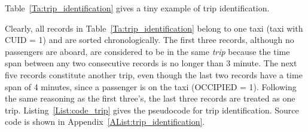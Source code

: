 Table~\ref{Ta:trip_identification} gives a tiny example of trip identification.

\begin{table}[h]
\centering
{}
\caption{An example of trip identification}\label{Ta:trip_identification}
\end{table}

Clearly, all records in Table~\ref{Ta:trip_identification} belong to one taxi (taxi with CUID = 1) and are sorted chronologically. The first three records, although no passengers are aboard, are considered to be in the same \emph{trip} because the time span between any two consecutive records is no longer than 3 minute. The next five records constitute another trip, even though the last two records have a time span of 4 minutes, since a passenger is on the taxi (OCCIPIED = 1). Following the same reasoning as the first three's, the last three records are treated as one trip. Listing~\ref{List:code_trip} gives the pseudocode for trip identification. Source code is shown in Appendix~\ref{AList:trip_identification}.

